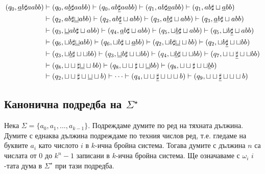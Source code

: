 \begin{example}
  \begin{align*}
    (q_0, \underline{a}b\sharp aabb) & \vdash (q_0, a\underline{b}\sharp aabb) \vdash (q_0, ab\underline{\sharp} aabb) \vdash (q_1, ab\sharp\underline{a}abb) \vdash (q_1, ab\sharp\sqcup\underline{a}bb)\\
                                     & \vdash (q_2, ab\sharp\underline{\sqcup}abb) \vdash (q_2, ab\underline{\sharp}\sqcup abb) \vdash (q_3, a\underline{b}\sharp\sqcup abb) \vdash (q_3, \underline{a}b\sharp\sqcup abb)\\
                                     & \vdash (q_3, \underline{\sqcup}ab\sharp\sqcup abb) \vdash (q_4, \underline{a}b\sharp\sqcup abb) \vdash (q_5, \sqcup\underline{b}\sharp \sqcup abb) \vdash (q_5, \sqcup b\underline{\sharp} \sqcup abb)\\
                                     & \vdash (q_6, \sqcup b \sharp \underline{\sqcup} abb) \vdash (q_6, \sqcup b \sharp \sqcup \underline{a}bb) \vdash (q_2, \sqcup b \sharp \underline{\sqcup}\sqcup bb) \vdash (q_2, \sqcup b \underline{\sharp} \sqcup\sqcup bb)\\
                                     & \vdash (q_3, \sqcup \underline{b} \sharp \sqcup\sqcup bb) \vdash (q_3, \underline{\sqcup} b \sharp \sqcup\sqcup bb) \vdash (q_4,  \sqcup \underline{b} \sharp \sqcup\sqcup bb) \vdash (q_7, \sqcup \sqcup \underline{\sharp} \sqcup\sqcup bb)\\
                                     & \vdash (q_8, \sqcup \sqcup \sharp \underline{\sqcup}\sqcup bb)\vdash (q_8, \sqcup \sqcup \sharp \sqcup \underline{\sqcup} bb) \vdash (q_8, \sqcup \sqcup \sharp \sqcup \sqcup \underline{b}b)\\
    & \vdash (q_2, \sqcup \sqcup \sharp \sqcup \underline{\sqcup} \sqcup b) \vdash \cdots \vdash (q_4, \sqcup\sqcup\underline{\sharp}\sqcup\sqcup\sqcup b) \vdash (q_9, \sqcup\sqcup\underline{\sharp}\sqcup\sqcup\sqcup b)
  \end{align*}
\end{example}

\subsection*{Канонична подредба на $\Sigma^\star$}

Нека $\Sigma = \{a_0,a_1,\dots,a_{k-1}\}$.
Подреждаме думите по ред на тяхната дължина.
Думите с еднаква дължина подреждаме по техния числов ред, т.е.
гледаме на буквите $a_i$ като числото $i$ в $k$-ична бройна система.
Тогава думите с дължина $n$ са числата от $0$ до $k^n-1$ записани в $k$-ична бройна система.
Ще означаваме с $\omega_i$ $i$-тата дума в $\Sigma^\star$ при тази подредба.

